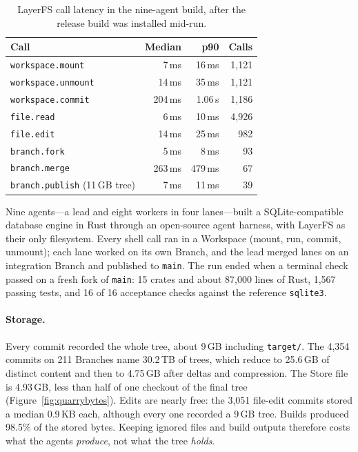 \documentclass[letterpaper,twocolumn,10pt]{article}
\newcommand{\sys}{LayerFS}
\newcommand{\ws}{Workspace}
\begin{document}
\begin{table}[t]
\centering
\small
\begin{tabular}{l r r r}
\toprule
Call & Median & p90 & Calls \\
\midrule
\texttt{workspace.mount}   & 7\,ms   & 16\,ms  & 1,121 \\
\texttt{workspace.unmount} & 14\,ms  & 35\,ms  & 1,121 \\
\texttt{workspace.commit}  & 204\,ms & 1.06\,s & 1,186 \\
\texttt{file.read}         & 6\,ms   & 10\,ms  & 4,926 \\
\texttt{file.edit}         & 14\,ms  & 25\,ms  & 982 \\
\texttt{branch.fork}       & 5\,ms   & 8\,ms   & 93 \\
\texttt{branch.merge}      & 263\,ms & 479\,ms & 67 \\
\texttt{branch.publish} (11\,GB tree) & 7\,ms & 11\,ms & 39 \\
\bottomrule
\end{tabular}
\caption{\sys{} call latency in the nine-agent build, after the release
build was installed mid-run.}
\label{tab:quarry-lat}
\end{table}

Nine agents---a lead and eight workers in four lanes---built a
SQLite-compatible database engine in Rust through an open-source agent
harness, with \sys{} as their only filesystem. Every shell call ran in a
\ws{} (mount, run, commit, unmount); each lane worked on its own Branch, and
the lead merged lanes on an integration Branch and published to
\texttt{main}. The run ended when a terminal check passed on a fresh fork of
\texttt{main}: 15 crates and about 87,000 lines of Rust, 1,567 passing tests,
and 16 of 16 acceptance checks against the reference \texttt{sqlite3}.

\paragraph{Storage.} Every commit recorded the whole tree, about 9\,GB
including \texttt{target/}. The 4,354 commits on 211 Branches name 30.2\,TB
of trees, which reduce to 25.6\,GB of distinct content and then to 4.75\,GB
after deltas and compression. The Store file is 4.93\,GB, less than half of
one checkout of the final tree (Figure~\ref{fig:quarrybytes}). Edits are
nearly
free: the 3,051 file-edit commits stored a median 0.9\,KB each, although
every one recorded a 9\,GB tree. Builds produced 98.5\% of the stored
bytes. Keeping ignored files and build outputs therefore costs what the
agents \emph{produce}, not what the tree \emph{holds}.
\end{document}
